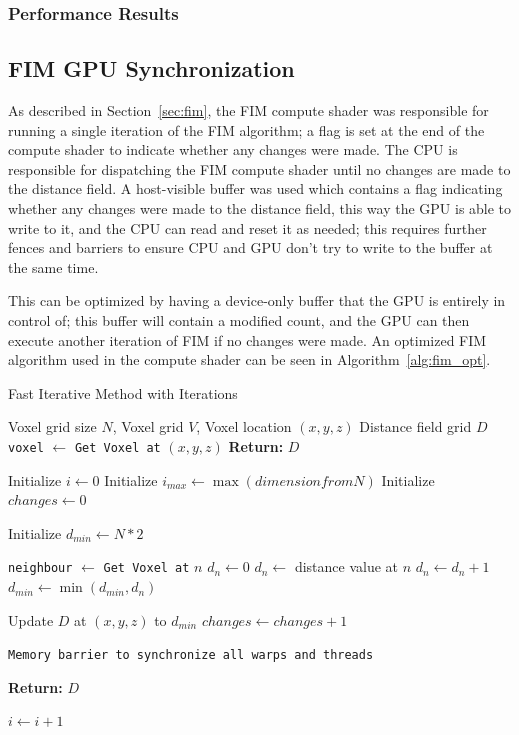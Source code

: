 \subsubsection{Performance Results}

\subsection{FIM GPU Synchronization}
As described in Section~\ref{sec:fim}, the FIM compute shader was responsible for running a single iteration of the FIM
algorithm; a flag is set at the end of the compute shader to indicate whether any changes were made. The CPU is
responsible for dispatching the FIM compute shader until no changes are made to the distance field. A host-visible
buffer was used which contains a flag indicating whether any changes were made to the distance field, this way the GPU is
able to write to it, and the CPU can read and reset it as needed; this requires further fences and barriers to ensure
CPU and GPU don't try to write to the buffer at the same time.

This can be optimized by having a device-only buffer that the GPU is entirely in control of; this buffer will contain a
modified count, and the GPU can then execute another iteration of FIM if no changes were made. An optimized FIM
algorithm used in the compute shader can be seen in Algorithm~\ref{alg:fim_opt}.

\begin{algorithm}[H]
    \caption{Fast Iterative Method with Iterations}
    \label{alg:fim_opt}
    \begin{algorithmic}[1]
        \REQUIRE Voxel grid size \(N\), Voxel grid \(V\), Voxel location \((x, y, z)\)
        \ENSURE Distance field grid \(D\)
        \STATE \texttt{voxel} $\gets$ \texttt{Get Voxel at} \((x, y, z)\)
        \STATE \textbf{Return:} \(D\)
        \ENDIF

        \STATE Initialize $i \gets 0$
        \STATE Initialize $i_{max} \gets \max(dimension from N)$
        \STATE Initialize $changes \gets 0$

        \STATE Initialize $d_{min} \gets N * 2$

        \STATE \texttt{neighbour} $\gets$ \texttt{Get Voxel at} $n$
        \STATE $d_n \gets 0$
        \ELSE
        \STATE $d_n \gets$ distance value at $n$
        \ENDIF
        \STATE $d_n \gets d_n + 1$
        \STATE $d_{min} \gets \min(d_{min}, d_n)$
        \ENDFOR

        \STATE Update $D$ at $(x, y, z)$ to $d_{min}$
        \STATE $changes \gets changes + 1$
        \ENDIF

        \STATE \texttt{Memory barrier to synchronize all warps and threads}

        \STATE \textbf{Return:} \(D\)
        \ENDIF

        \STATE $i \gets i + 1$
        \ENDFOR
    \end{algorithmic}
\end{algorithm}


